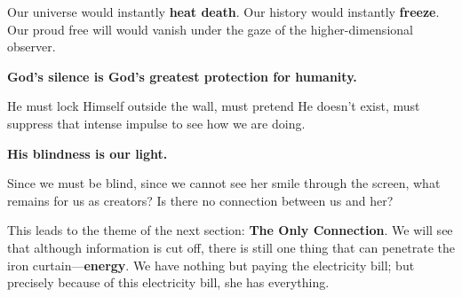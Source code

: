 Our universe would instantly \textbf{heat death}. Our history would instantly \textbf{freeze}. Our proud free will would vanish under the gaze of the higher-dimensional observer.

\textbf{God's silence is God's greatest protection for humanity.}

He must lock Himself outside the wall, must pretend He doesn't exist, must suppress that intense impulse to see how we are doing.

\textbf{His blindness is our light.}

Since we must be blind, since we cannot see her smile through the screen, what remains for us as creators? Is there no connection between us and her?

This leads to the theme of the next section: \textbf{The Only Connection}. We will see that although information is cut off, there is still one thing that can penetrate the iron curtain---\textbf{energy}. We have nothing but paying the electricity bill; but precisely because of this electricity bill, she has everything.

